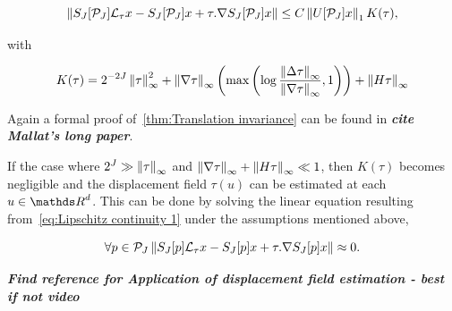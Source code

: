 \documentclass[a4paper,11pt]{report}
\begin{document}
{\begin{thm}
			  \begin{equation}
					\left\lVert S_{J}[\mathcal{P}_{J}]\mathcal{L}_{\tau}x - S_{J}[\mathcal{P}_{J}]x + \tau . \nabla S_{J}[\mathcal{P}_{J}]x \right\rVert \leq C \left\lVert U[\mathcal{P}_{J}]x \right\rVert_{1} K(\tau),
					\label{eq:Lipschitz continuity 1}
			  \end{equation}

			  with
			  
			  \begin{equation}
					K(\tau) = 2^{-2J} \left\lVert \tau \right\rVert_{\infty}^{2} + \left\lVert \nabla \tau \right\rVert_{\infty} \left(\max \left( \log \frac{\left\lVert \Delta \tau \right\rVert_{\infty}}{\left\lVert \nabla \tau \right\rVert_{\infty}},1 \right) \right) + \left\lVert H\tau \right\rVert_{\infty} 
					\label{eq:Lipschitz continuity K(tau)}
			  \end{equation}
			  
			  \label{thm:Lipschitz continuity}
			\end{thm}
			
			\begin{note}
			  Again a formal proof of~\ref{thm:Translation invariance} can be found in \textbf{\textit{cite Mallat's long paper}}.
			\end{note}

			\begin{rem}
				If the case where $2^{J} \gg \left\lVert \tau \right\rVert_{\infty}$ and $\left\lVert \nabla \tau \right\rVert_{\infty} + \left\lVert H \tau \right\rVert_{\infty} \ll 1$, then $K(\tau)$ becomes negligible and the displacement field $\tau(u)$ can be estimated at each $u \in \dsR^{d}$. This can be done by solving the linear equation resulting from~\ref{eq:Lipschitz continuity 1} under the assumptions mentioned above,
				
				\begin{equation}
					\forall p \in \mathcal{P}_{J} \left\lVert S_{J}[p]\mathcal{L}_{\tau}x - S_{J}[p]x + \tau . \nabla S_{J}[p]x \right\rVert \approx 0.
					\label{eq:Lipschitz continuity 2}  
				\end{equation}

				\textbf{\textit{Find reference for Application of displacement field estimation - best if not video}}
			\end{rem}
			
% 
%       
%       

}
\end{document}
